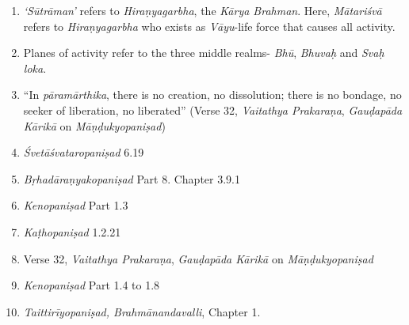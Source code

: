 \begin{enumerate}
\itemsep=0pt
\item
  \emph{`Sūtrāman'} refers to \emph{Hiraṇyagarbha}, the \emph{Kārya Brahman}. Here, \emph{Mātariśvā} refers to \emph{Hiraṇyagarbha} who exists as \emph{Vāyu}-life force that causes all activity.
\item
  Planes of activity refer to the three middle realms- \emph{Bhū}, \emph{Bhuvaḥ} and \emph{Svaḥ} \emph{loka}.
\item
  ``In \emph{pāramārthika}, there is no creation, no dissolution; there is no bondage, no seeker of liberation, no liberated'' (Verse 32, \emph{Vaitathya Prakaraṇa}, \emph{Gauḍapāda Kārikā} on \emph{Māṇḍukyopaniṣad})
\item
  \emph{Śvetāśvataropaniṣad} 6.19
\item
  \emph{Bṛhadāraṇyakopaniṣad} Part 8. Chapter 3.9.1
\item
  \emph{Kenopaniṣad} Part 1.3
\item
  \emph{Kaṭhopaniṣad} 1.2.21
\item
  Verse 32, \emph{Vaitathya Prakaraṇa}, \emph{Gauḍapāda Kārikā} on \emph{Māṇḍu\-kyo\-pani\-ṣad}
\item
  \emph{Kenopaniṣad} Part 1.4 to 1.8
\item
  \emph{Taittirīyopaniṣad, Brahmānandavalli}, Chapter 1.
\end{enumerate}

